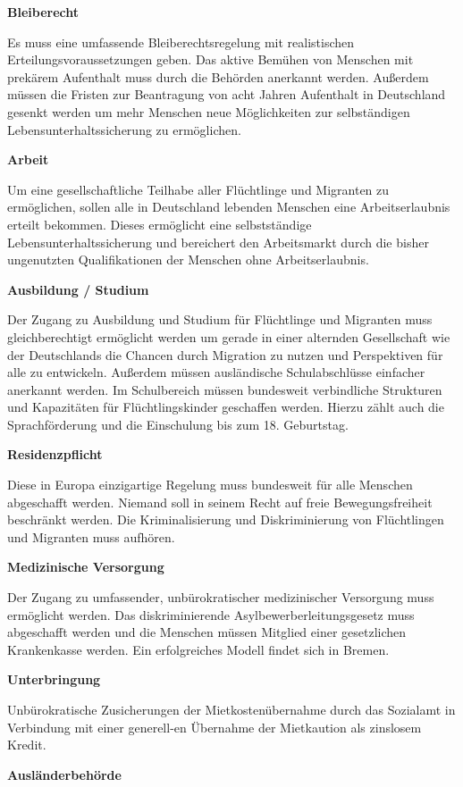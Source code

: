 \textbf{Bleiberecht}

Es muss eine umfassende Bleiberechtsregelung mit realistischen
Erteilungsvoraussetzungen geben. Das aktive Bemühen von Menschen mit prekärem
Aufenthalt muss durch die Behörden anerkannt werden. Außerdem müssen die Fristen
zur Beantragung von acht Jahren Aufenthalt in Deutschland gesenkt werden um mehr
Menschen neue Möglichkeiten zur selbständigen Lebensunterhaltssicherung zu
ermöglichen.

\textbf{Arbeit}

Um eine gesellschaftliche Teilhabe aller Flüchtlinge und Migranten zu
ermöglichen, sollen alle in Deutschland lebenden Menschen eine Arbeitserlaubnis
erteilt bekommen. Dieses ermöglicht eine selbstständige
Lebensunterhaltssicherung und bereichert den Arbeitsmarkt durch die bisher
ungenutzten Qualifikationen der Menschen ohne Arbeitserlaubnis.

\textbf{Ausbildung / Studium}

Der Zugang zu Ausbildung und Studium für Flüchtlinge und Migranten muss
gleichberechtigt ermöglicht werden um gerade in einer alternden Gesellschaft wie
der Deutschlands die Chancen durch Migration zu nutzen und Perspektiven für alle
zu entwickeln. Außerdem müssen ausländische Schulabschlüsse einfacher anerkannt
werden. Im Schulbereich müssen bundesweit verbindliche Strukturen und
Kapazitäten für Flüchtlingskinder geschaffen werden. Hierzu zählt auch die
Sprachförderung und die Einschulung bis zum 18. Geburtstag.

\textbf{Residenzpflicht}

Diese in Europa einzigartige Regelung muss bundesweit für alle Menschen
abgeschafft werden. Niemand soll in seinem Recht auf freie Bewegungsfreiheit
beschränkt werden. Die Kriminalisierung und Diskriminierung von Flüchtlingen und
Migranten muss aufhören.

\textbf{Medizinische Versorgung}

Der Zugang zu umfassender, unbürokratischer medizinischer Versorgung muss
ermöglicht werden. Das diskriminierende Asylbewerberleitungsgesetz muss
abgeschafft werden und die Menschen müssen Mitglied einer gesetzlichen
Krankenkasse werden. Ein erfolgreiches Modell findet sich in Bremen.

\textbf{Unterbringung}

Unbürokratische Zusicherungen der Mietkostenübernahme durch das Sozialamt in
Verbindung mit einer generell-en Übernahme der Mietkaution als zinslosem Kredit.

\textbf{Ausländerbehörde}

